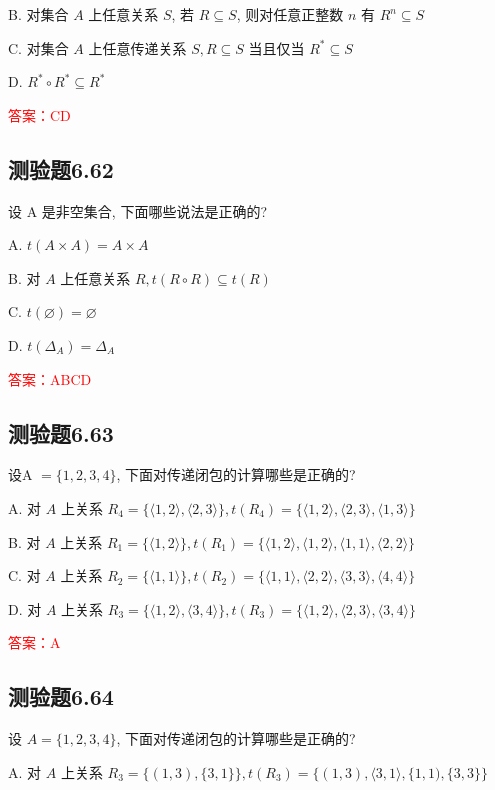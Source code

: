 \documentclass[UTF8, heading=true]{ctexart}
\begin{document}
B. 对集合 $A$ 上任意关系 $S$, 若 $R \subseteq S$, 则对任意正整数 $n$ 有 $R^n \subseteq S$

C. 对集合 $A$ 上任意传递关系 $S, R \subseteq S$ 当且仅当 $R^* \subseteq S$

D. $R^* \circ R^* \subseteq R^*$

\textcolor{red}{答案：CD}


\subsection{测验题6.62}
设 A 是非空集合, 下面哪些说法是正确的?

A. $t(A \times A)=A \times A$

B. 对 $A$ 上任意关系 $R, t(R \circ R) \subseteq t(R)$

C. $t(\varnothing)=\varnothing$

D. $t\left(\Delta_A\right)=\Delta_A$

\textcolor{red}{答案：ABCD}

\subsection{测验题6.63}

设A $=\{1,2,3,4\}$, 下面对传递闭包的计算哪些是正确的?

A. 对 $A$ 上关系 $R_4=\{\langle 1,2\rangle,\langle 2,3\rangle\}, t\left(R_4\right)=\{\langle 1,2\rangle,\langle 2,3\rangle,\langle 1,3\rangle\}$

B. 对 $A$ 上关系 $R_1=\{\langle 1,2\rangle\}, t\left(R_1\right)=\{\langle 1,2\rangle,\langle 1,2\rangle,\langle 1,1\rangle,\langle 2,2\rangle\}$

C. 对 $A$ 上关系 $R_2=\{\langle 1,1\rangle\}, t\left(R_2\right)=\{\langle 1,1\rangle,\langle 2,2\rangle,\langle 3,3\rangle,\langle 4,4\rangle\}$

D. 对 $A$ 上关系 $R_3=\{\langle 1,2\rangle,\langle 3,4\rangle\}, t\left(R_3\right)=\{\langle 1,2\rangle,\langle 2,3\rangle,\langle 3,4\rangle\}$

\textcolor{red}{答案：A}

\subsection{测验题6.64}

设 $A=\{1,2,3,4\}$, 下面对传递闭包的计算哪些是正确的?

A. 
对 $A$ 上关系 $R_3=\{(1,3),\{3,1\}\}, t\left(R_3\right)=\{(1,3),\langle 3,1\rangle,\{1,1),\{3,3\}\}$
\end{document}
